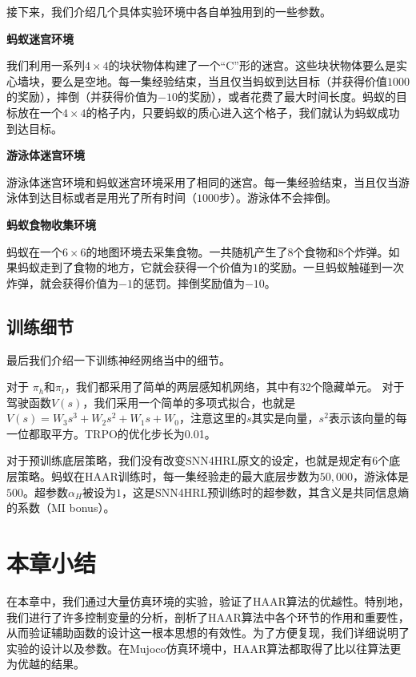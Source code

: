 接下来，我们介绍几个具体实验环境中各自单独用到的一些参数。

\textbf{蚂蚁迷宫环境}

我们利用一系列$4\times4$的块状物体构建了一个``C''形的迷宫。这些块状物体要么是实心墙块，要么是空地。每一集经验结束，当且仅当蚂蚁到达目标（并获得价值$1000$的奖励），摔倒（并获得价值为$-10$的奖励），或者花费了最大时间长度。蚂蚁的目标放在一个$4\times4$的格子内，只要蚂蚁的质心进入这个格子，我们就认为蚂蚁成功到达目标。

\textbf{游泳体迷宫环境}

游泳体迷宫环境和蚂蚁迷宫环境采用了相同的迷宫。每一集经验结束，当且仅当游泳体到达目标或者是用光了所有时间（$1000$步）。游泳体不会摔倒。

\textbf{蚂蚁食物收集环境}

蚂蚁在一个$6\times6$的地图环境去采集食物。一共随机产生了8个食物和8个炸弹。如果蚂蚁走到了食物的地方，它就会获得一个价值为$1$的奖励。一旦蚂蚁触碰到一次炸弹，就会获得价值为$-1$的惩罚。摔倒奖励值为$-10$。

\subsection{训练细节}
最后我们介绍一下训练神经网络当中的细节。

对于 $\pi_h$和$\pi_l$，我们都采用了简单的两层感知机网络，其中有32个隐藏单元。
对于驾驶函数$V(s)$，我们采用一个简单的多项式拟合，也就是$V(s) = W_3s^3 + W_2s^2 + W_1s + W_0$，注意这里的$s$其实是向量，$s^2$表示该向量的每一位都取平方。TRPO的优化步长为0.01。

对于预训练底层策略，我们没有改变SNN4HRL原文的设定，也就是规定有6个底层策略。蚂蚁在HAAR训练时，每一集经验走的最大底层步数为$50,000$，游泳体是$500$。超参数$\alpha_H$被设为$1$，这是SNN4HRL预训练时的超参数，其含义是共同信息熵的系数（MI bonus）。

\section{本章小结}
在本章中，我们通过大量仿真环境的实验，验证了HAAR算法的优越性。特别地，我们进行了许多控制变量的分析，剖析了HAAR算法中各个环节的作用和重要性，从而验证辅助函数的设计这一根本思想的有效性。为了方便复现，我们详细说明了实验的设计以及参数。在Mujoco仿真环境中，HAAR算法都取得了比以往算法更为优越的结果。
